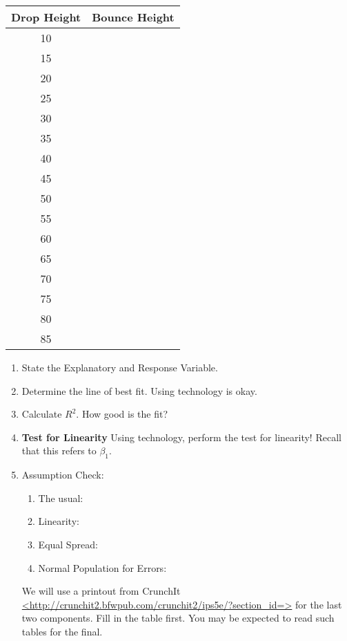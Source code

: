 \documentclass[12pt]{amsart}
\theoremstyle{definition}
\begin{document}
\begin{center}
\begin{tabular}{|c|c|}
\hline
Drop Height & Bounce Height \\
\hline
10 & \\
\hline
15 & \\
\hline
20 & \\
\hline
25 & \\
\hline
30 & \\
\hline
35 & \\
\hline
40 & \\
\hline
45 & \\
\hline
50 & \\
\hline
55 & \\
\hline
60 & \\
\hline
65 & \\
\hline
70 & \\
\hline
75 & \\
\hline
80 & \\
\hline
85 & \\
\hline
\end{tabular}
\begin{enumerate}
\item State the Explanatory and Response Variable.
\vspace{0.3in}
\item Determine the line of best fit. Using technology is okay.
\vspace{0.3in}
\item Calculate $R^2$. How good is the fit?
\vspace{0.3in}
\item \textbf{Test for Linearity} Using technology, perform the test for linearity! Recall that this refers to $\beta_1$.
\vfill
\item Assumption Check:
\begin{enumerate}
\item The usual: 
\item Linearity: 
\item Equal Spread: 
\item Normal Population for Errors: 
\vspace{0.5in}
\end{enumerate}
\newpage
\noindent We will use a printout from CrunchIt \url{<http://crunchit2.bfwpub.com/crunchit2/ips5e/?section_id=>} for the last two components. Fill in the table first. You may be expected to read such tables for the final.


\end{enumerate}
\end{center}
\end{document}
